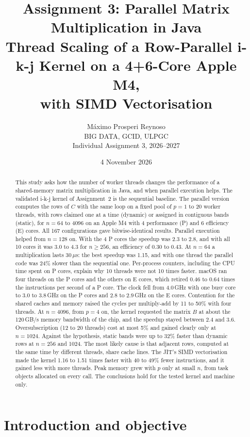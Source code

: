 \documentclass[11pt,a4paper]{article}
\title{\textbf{Assignment 3: Parallel Matrix Multiplication in Java}\\[4pt]
\large Thread Scaling of a Row-Parallel i-k-j Kernel on a 4+6-Core Apple M4,\\
with SIMD Vectorisation}
\author{Máximo Prosperi Reynoso\\[2pt]
\small BIG DATA, GCID, ULPGC\\
\small Individual Assignment 3, 2026--2027\\[2pt]
\small \repourl}
\date{4 November 2026}
\begin{document}
\maketitle

\begin{abstract}
\noindent
This study asks how the number of worker threads changes the performance of a
shared-memory matrix multiplication in Java, and when parallel execution
helps. The validated i-k-j kernel of Assignment~2 is the sequential baseline.
The parallel version computes the rows of $C$ with the same loop on a fixed
pool of $p=1$ to 20 worker threads, with rows claimed one at a time (dynamic)
or assigned in contiguous bands (static), for $n=64$ to 4096 on an Apple M4
with 4 performance (P) and 6 efficiency (E) cores. All 167 configurations gave
bitwise-identical results. Parallel execution helped from $n=128$ on. With the
4 P cores the speedup was 2.3 to 2.8, and with all 10 cores it was 3.0 to 4.3
for $n\ge256$, an efficiency of 0.30 to 0.43. At $n=64$ a multiplication lasts
30\,$\mu$s: the best speedup was 1.15, and with one thread the parallel code was
24\% slower than the sequential one. Per-process counters, including the CPU
time spent on P cores, explain why 10 threads were not 10 times faster. macOS
ran four threads on the P cores and the others on E cores, which retired 0.46
to 0.64 times the instructions per second of a P core. The clock fell from
4.0\,GHz with one busy core to 3.0 to 3.8\,GHz on the P cores and 2.8 to
2.9\,GHz on the E cores. Contention for the shared caches and memory raised the cycles per
multiply-add by 11 to 50\% with four threads. At $n=4096$, from $p=4$ on, the
kernel requested the matrix $B$ at about the 120\,GB/s memory bandwidth of the
chip, and the speedup stayed between 2.4 and 3.6. Oversubscription (12 to 20
threads) cost at most 5\% and gained clearly only at $n=1024$. Against the
hypothesis, static bands were up to 32\% faster than dynamic rows at $n=256$
and 1024. The most likely cause is that adjacent rows, computed at the same
time by different threads, share cache lines. The JIT's SIMD vectorisation made
the kernel 1.16 to 1.51 times faster with 40 to 49\% fewer instructions, and
it gained less with more threads. Peak memory grew with $p$ only at small $n$,
from task objects allocated on every call. The conclusions hold for the tested
kernel and machine only.
\end{abstract}

\section{Introduction and objective}
\end{document}
